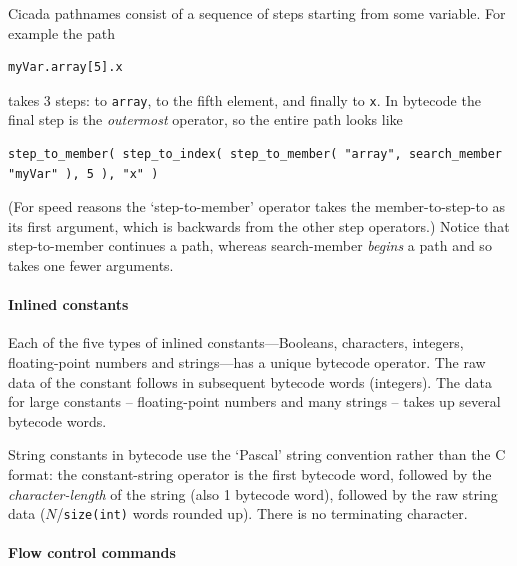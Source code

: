\documentclass{article}
\newenvironment{code}{
       \begin{list}{}{
               \setlength{\leftmargin}{.4in}
               \setlength{\rightmargin}{0in}
               \setlength{\topsep}{.2in}
       }
       \small
       \item[] }
       { \end{list}   }
\begin{document}
Cicada pathnames consist of a sequence of steps starting from some variable.  For example the path 

\begin{code} \begin{verbatim}
myVar.array[5].x
\end{verbatim} \end{code}

\noindent takes 3 steps:  to \verb#array#, to the fifth element, and finally to \verb#x#.  In bytecode the final step is the \emph{outermost} operator, so the entire path looks like

\begin{code} \begin{verbatim}
step_to_member( step_to_index( step_to_member( "array", search_member "myVar" ), 5 ), "x" )
\end{verbatim} \end{code}

\noindent (For speed reasons the `step-to-member' operator takes the member-to-step-to as its first argument, which is backwards from the other step operators.)  Notice that step-to-member continues a path, whereas search-member \emph{begins} a path and so takes one fewer arguments.




\paragraph{Inlined constants}

Each of the five types of inlined constants---Booleans, characters, integers, floating-point numbers and strings---has a unique bytecode operator.  The raw data of the constant follows in subsequent bytecode words (integers).  The data for large constants -- floating-point numbers and many strings -- takes up several bytecode words.

String constants in bytecode use the `Pascal' string convention rather than the C format:  the constant-string operator is the first bytecode word, followed by the \emph{character-length} of the string (also 1 bytecode word), followed by the raw string data ($N$/\verb#size(int)# words rounded up).  There is no terminating character.



\paragraph{Flow control commands}
\end{document}
